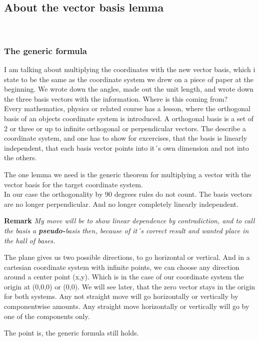 \documentclass[a4paper]{article}
\begin{document}
\subsection{About the vector basis lemma}\\

\subsubsection{The generic formula}

I am talking about multiplying the coordinates with the new vector basis, which i state to be the same as the coordinate system we drew on a piece of paper at the beginning. We wrote down the angles, made out the unit length, and wrote down the three basis vectors with the information. Where is this coming from?\\

Every mathematics, physics or related course has a lesson, where the orthogonal basis of an objects coordinate system is introduced. 
A orthogonal basis is a set of 2 or three or up to infinite orthogonal or perpendicular vectors. The describe a coordinate system, and one has to show for excercises, that the basis is linearly independent, that each basis vector points into it´s own dimension and not into the others.

The one lemma we need is the generic theorem for multiplying a vector with the vector basis for the target coordinate system.\\
In our case the orthogonality by 90 degrees rules do not count. The basis vectors are no longer perpendicular. And no longer completely linearly independent. 

\textbf{Remark} \emph{My move will be to show linear dependence by contradiction, and to call the basis a \textbf{pseudo-}basis then,
because of it´s correct result and wanted place in the hall of bases.}

The plane gives us two possible directions, to go horizontal or vertical. And in a cartesian coordinate system with infinite points, we can choose any direction around a center point (x,y). Which is in the case of our coordinate system the origin at (0,0,0) or (0,0). We will see later, that the zero vector stays in the origin for both systems.
Any not straight move will go horizontally or vertically by componentwise amounts. Any straight move horizontally or vertically will go by one of the components only.

The point is, the generic formula still holds.\\
\end{document}

